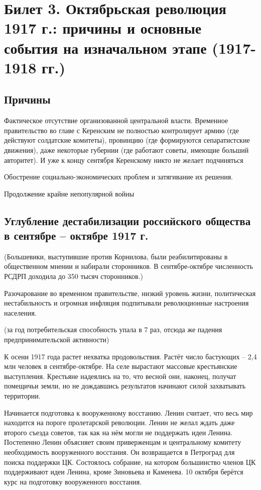 \section{Билет 3. Октябрьская революция 1917 г.: причины и основные события на изначальном этапе (1917-1918 гг.)}

\subsection{Причины}

Фактическое отсутствие организованной центральной власти. Временное правительство во главе с Керенским не полностью контролирует армию (где действуют солдатские комитеты), провинцию (где формируются сепаратистские движения), даже некоторые губернии (где работают советы, имеющие больший авторитет). И уже к концу сентября Керенскому никто не желает подчиняться

Обострение социально-экономических проблем и затягивание их решения.

Продолжение крайне непопулярной войны

\subsection{Углубление дестабилизации российского общества в сентябре – октябре 1917 г.}

(Большевики, выступившие против Корнилова, были реабилитированы в общественном мнении и набирали сторонников. В сентябре-октябре численность РСДРП доходила до 350 тысяч сторонников.)

Разочарование во временном правительстве, низкий уровень жизни, политическая нестабильность и огромная инфляция подпитывали революционные настроения населения.

(за год потребительская способность упала в 7 раз, отсюда же падения предпринимательской активности)

К осени 1917 года растет нехватка продовольствия. Растёт число бастующих – 2,4 млн человек в сентябре-октябре. На селе вырастают массовые крестьянские выступления. Крестьяне надеялись на то, что весной они, наконец, получат помещичьи земли, но не дождавшись результатов начинают силой захватывать территории.

Начинается подготовка к вооруженному восстанию. Ленин считает, что весь мир находится на пороге пролетарской революции. Ленин не желал ждать даже второго съезда советов, так как на нём могли не поддержать идеи Ленина. Постепенно Ленин объясняет своим приверженцам и центральному комитету необходимость вооруженного восстания. Он возвращается в Петроград для поиска поддержки ЦК. Состоялось собрание, на котором большинство членов ЦК поддерживают идеи Ленина, кроме Зиновьева и Каменева. 10 октября берётся курс на подготовку вооруженного восстания.

